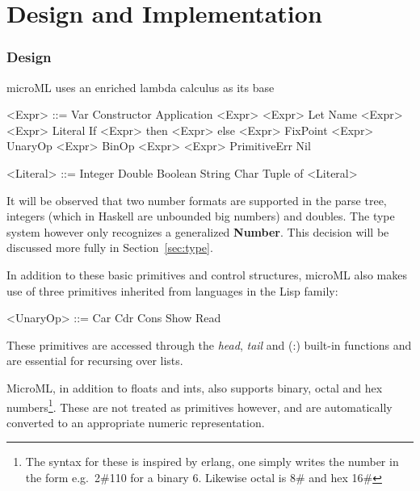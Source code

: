 \documentclass[12pt, a4paper]{report}
\begin{document}
\chapter{Design and Implementation}

\subsection{Design}
microML uses an enriched lambda calculus as its base
\vspace{5mm}

\begin{minipage}[t]{0.5\textwidth}
    \begin{grammar}
        <Expr> ::= Var
        \alt{} Constructor 
        \alt{} Application <Expr> <Expr>
        \alt{} Let Name <Expr> <Expr>
        \alt{} Literal 
        \alt{} If <Expr> then <Expr> else <Expr>
        \alt{} FixPoint <Expr>
        \alt{} UnaryOp <Expr>
        \alt{} BinOp <Expr> <Expr>
        \alt{} PrimitiveErr 
        \alt{} Nil
    \end{grammar}
\end{minipage}
\begin{minipage}[t]{0.5\textwidth}
    \begin{grammar}
        <Literal> ::= Integer
        \alt{} Double
        \alt{} Boolean
        \alt{} String
        \alt{} Char
        \alt{} Tuple of <Literal>
    \end{grammar}
\end{minipage}
\vspace{5mm}

It will be observed that two number formats are supported in the parse tree, integers (which in
Haskell are unbounded big numbers) and doubles. The type system however only recognizes a
generalized \textbf{Number}. This decision will be discussed more fully in Section~\ref{sec:type}.

In addition to these basic primitives and control structures, microML also makes use of three
primitives inherited from languages in the Lisp family:

\begin{grammar}
    <UnaryOp> ::= Car
    \alt{} Cdr
    \alt{} Cons
    \alt{} Show
    \alt{} Read
\end{grammar}

These primitives are accessed through the \textit{head}, \textit{tail} and (:) built-in functions and are
essential for recursing over lists.\

MicroML, in addition to floats and ints, also supports binary, octal and hex numbers\footnote{The
    syntax for these is inspired by erlang, one simply writes the number in the form e.g.\ 2\#110 for a
    binary 6. Likewise octal is 8\# and hex 16\#}. These are not
treated as primitives however, and are automatically converted to an appropriate numeric representation.
\end{document}
